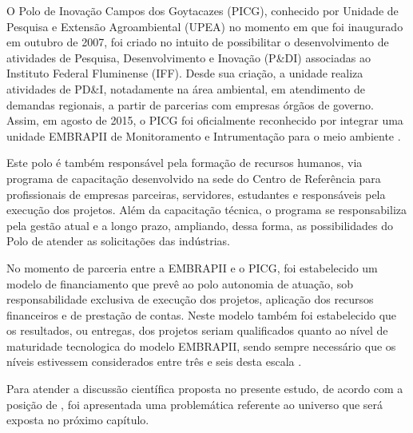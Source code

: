 O Polo de Inovação Campos dos Goytacazes (PICG), conhecido por Unidade de Pesquisa e Extensão Agroambiental (UPEA) no momento em que foi inaugurado em outubro de 2007, foi criado no intuito de possibilitar o desenvolvimento de atividades de Pesquisa, Desenvolvimento e Inovação (P\&DI) associadas ao Instituto Federal Fluminense (IFF). Desde sua criação, a unidade realiza atividades de PD\&I, notadamente na área ambiental, em atendimento de demandas regionais, a partir de parcerias com empresas  órgãos de governo. Assim, em agosto de 2015, o PICG foi oficialmente reconhecido por integrar uma unidade EMBRAPII de Monitoramento e Intrumentação para o meio ambiente \cite{embrapiiff}.

Este polo é também responsável pela formação de recursos humanos, via programa de capacitação desenvolvido na sede do Centro de Referência para profissionais de empresas parceiras, servidores, estudantes e responsáveis pela execução dos projetos. Além da capacitação técnica, o programa se responsabiliza pela gestão atual e a longo prazo, ampliando, dessa forma, as possibilidades do Polo de atender as solicitações das indústrias.

No momento de parceria entre a EMBRAPII e o PICG, foi estabelecido um modelo de financiamento que prevê ao polo autonomia de atuação, sob responsabilidade exclusiva de execução dos projetos, aplicação dos recursos financeiros e de prestação de contas. Neste modelo também foi estabelecido que os resultados, ou entregas, dos projetos seriam qualificados quanto ao nível de maturidade tecnologica do modelo EMBRAPII, sendo sempre necessário que os níveis estivessem considerados entre três e seis desta escala \cite{iffembrapii2016}.

Para atender a discussão científica proposta no presente estudo, de acordo com a posição de , foi apresentada uma problemática referente ao universo que será exposta no próximo capítulo.

